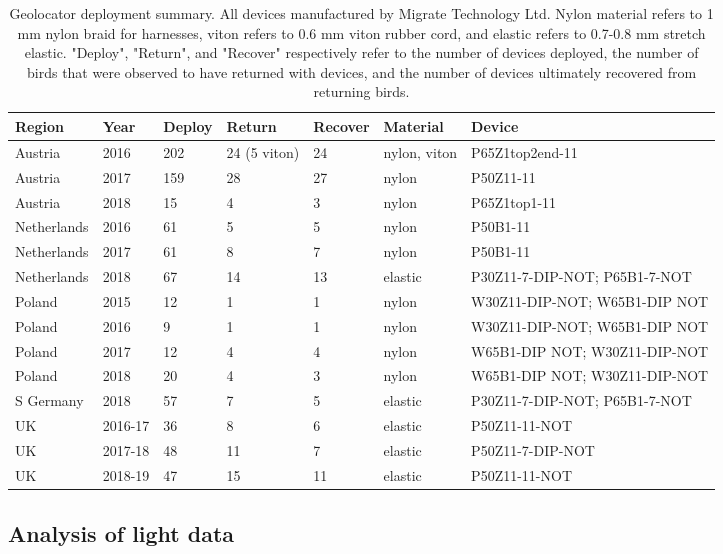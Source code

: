 \documentclass[a4paper, nobind]{templates/ociamthesis}
\begin{document}
\begin{table}[t]

\caption{\label{tab:capture-recapture-table}Geolocator deployment summary. All devices manufactured by Migrate Technology Ltd. Nylon material refers to 1 mm nylon braid for harnesses, viton refers to 0.6 mm viton rubber cord, and elastic refers to 0.7-0.8 mm stretch elastic. "Deploy", "Return", and "Recover" respectively refer to the number of devices deployed, the number of birds that were observed to have returned with devices, and the number of devices ultimately recovered from returning birds.}
\centering
\fontsize{9.5}{11.5}\selectfont
\begin{tabular}{l|l|l|l|l|l|>{\raggedright\arraybackslash}p{9em}}
\hline
Region & Year & Deploy & Return & Recover & Material & Device\\
\hline
Austria & 2016 & 202 & 24 (5 viton) & 24 & nylon, viton & P65Z1top2end-11\\
\hline
Austria & 2017 & 159 & 28 & 27 & nylon & P50Z11-11\\
\hline
Austria & 2018 & 15 & 4 & 3 & nylon & P65Z1top1-11\\
\hline
Netherlands & 2016 & 61 & 5 & 5 & nylon & P50B1-11\\
\hline
Netherlands & 2017 & 61 & 8 & 7 & nylon & P50B1-11\\
\hline
Netherlands & 2018 & 67 & 14 & 13 & elastic & P30Z11-7-DIP-NOT; P65B1-7-NOT\\
\hline
Poland & 2015 & 12 & 1 & 1 & nylon & W30Z11-DIP-NOT; W65B1-DIP NOT\\
\hline
Poland & 2016 & 9 & 1 & 1 & nylon & W30Z11-DIP-NOT; W65B1-DIP NOT\\
\hline
Poland & 2017 & 12 & 4 & 4 & nylon & W65B1-DIP NOT; W30Z11-DIP-NOT\\
\hline
Poland & 2018 & 20 & 4 & 3 & nylon & W65B1-DIP NOT; W30Z11-DIP-NOT\\
\hline
S Germany & 2018 & 57 & 7 & 5 & elastic & P30Z11-7-DIP-NOT; P65B1-7-NOT\\
\hline
UK & 2016-17 & 36 & 8 & 6 & elastic & P50Z11-11-NOT\\
\hline
UK & 2017-18 & 48 & 11 & 7 & elastic & P50Z11-7-DIP-NOT\\
\hline
UK & 2018-19 & 47 & 15 & 11 & elastic & P50Z11-11-NOT\\
\hline
\end{tabular}
\end{table}

\hypertarget{analysis-of-light-data}{%
\subsection{Analysis of light data}\label{analysis-of-light-data}}
\end{document}
